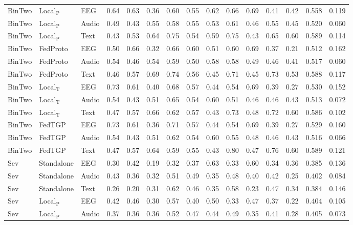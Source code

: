 \begin{longtable}{lllcccccccccccc}
BinTwo & Local$_{\mathrm{P}}$ & EEG & 0.64 & 0.63 & 0.36 & 0.60 & 0.55 & 0.62 & 0.66 & 0.69 & 0.41 & 0.42 & 0.558 & 0.119 \\
BinTwo & Local$_{\mathrm{P}}$ & Audio & 0.49 & 0.43 & 0.55 & 0.58 & 0.55 & 0.53 & 0.61 & 0.46 & 0.55 & 0.45 & 0.520 & 0.060 \\
BinTwo & Local$_{\mathrm{P}}$ & Text & 0.43 & 0.53 & 0.64 & 0.75 & 0.54 & 0.59 & 0.75 & 0.43 & 0.65 & 0.60 & 0.589 & 0.114 \\
BinTwo & FedProto & EEG & 0.50 & 0.66 & 0.32 & 0.66 & 0.60 & 0.51 & 0.60 & 0.69 & 0.37 & 0.21 & 0.512 & 0.162 \\
BinTwo & FedProto & Audio & 0.54 & 0.46 & 0.54 & 0.59 & 0.50 & 0.58 & 0.58 & 0.49 & 0.46 & 0.41 & 0.517 & 0.060 \\
BinTwo & FedProto & Text & 0.46 & 0.57 & 0.69 & 0.74 & 0.56 & 0.45 & 0.71 & 0.45 & 0.73 & 0.53 & 0.588 & 0.117 \\
BinTwo & Local$_{\mathrm{T}}$ & EEG & 0.73 & 0.61 & 0.40 & 0.68 & 0.57 & 0.44 & 0.54 & 0.69 & 0.39 & 0.27 & 0.530 & 0.152 \\
BinTwo & Local$_{\mathrm{T}}$ & Audio & 0.54 & 0.43 & 0.51 & 0.65 & 0.54 & 0.60 & 0.51 & 0.46 & 0.46 & 0.43 & 0.513 & 0.072 \\
BinTwo & Local$_{\mathrm{T}}$ & Text & 0.47 & 0.57 & 0.66 & 0.62 & 0.57 & 0.43 & 0.73 & 0.48 & 0.72 & 0.60 & 0.586 & 0.102 \\
BinTwo & FedTGP & EEG & 0.73 & 0.61 & 0.36 & 0.71 & 0.57 & 0.44 & 0.54 & 0.69 & 0.39 & 0.27 & 0.529 & 0.160 \\
BinTwo & FedTGP & Audio & 0.54 & 0.43 & 0.51 & 0.62 & 0.54 & 0.60 & 0.55 & 0.48 & 0.46 & 0.43 & 0.516 & 0.066 \\
BinTwo & FedTGP & Text & 0.47 & 0.57 & 0.64 & 0.59 & 0.55 & 0.43 & 0.80 & 0.47 & 0.76 & 0.60 & 0.589 & 0.121 \\
\midrule
Sev & Standalone & EEG & 0.30 & 0.42 & 0.19 & 0.32 & 0.37 & 0.63 & 0.33 & 0.60 & 0.34 & 0.36 & 0.385 & 0.136 \\
Sev & Standalone & Audio & 0.43 & 0.36 & 0.32 & 0.51 & 0.49 & 0.35 & 0.48 & 0.40 & 0.42 & 0.25 & 0.402 & 0.084 \\
Sev & Standalone & Text & 0.26 & 0.20 & 0.31 & 0.62 & 0.46 & 0.35 & 0.58 & 0.23 & 0.47 & 0.34 & 0.384 & 0.146 \\
Sev & Local$_{\mathrm{P}}$ & EEG & 0.42 & 0.46 & 0.30 & 0.57 & 0.40 & 0.50 & 0.33 & 0.47 & 0.37 & 0.22 & 0.404 & 0.105 \\
Sev & Local$_{\mathrm{P}}$ & Audio & 0.37 & 0.36 & 0.36 & 0.52 & 0.47 & 0.44 & 0.49 & 0.35 & 0.41 & 0.28 & 0.405 & 0.073 \\

\end{longtable}
